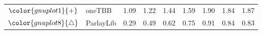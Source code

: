 \begin{tabular}{clrrrrrrr}
\rowcolor{gnuplot1!10}$\color{gnuplot1}{+}$ & oneTBB & \cellcolor{gnuplot1!10} 1.09 & \cellcolor{gnuplot1!10} 1.22 & \cellcolor{gnuplot1!10} 1.44 & \cellcolor{gnuplot1!10} 1.59 & \cellcolor{gnuplot1!10} 1.90 & \cellcolor{gnuplot1!10} 1.84 & \cellcolor{gnuplot1!10} 1.87 \\
\rowcolor{gnuplot8!10}$\color{gnuplot8}{\triangle}$ & ParlayLib & \cellcolor{gnuplot8!10} 0.29 & \cellcolor{gnuplot8!10} 0.49 & \cellcolor{gnuplot8!10} 0.62 & \cellcolor{gnuplot8!10} 0.75 & \cellcolor{gnuplot8!10} 0.91 & \cellcolor{gnuplot8!10} 0.84 & \cellcolor{gnuplot8!10} 0.83 \\
\bottomrule
\end{tabular}
